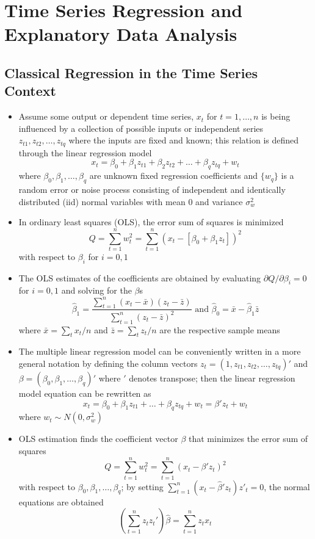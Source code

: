\documentclass[12pt]{article}
\begin{document}
\section{Time Series Regression and Explanatory Data Analysis}
\subsection{Classical Regression in the Time Series Context}
\begin{itemize}
\item Assume some output or dependent time series, $x_t$ for $t = 1,\dots,n$ is being influenced by a collection of possible inputs or independent series $z_{t1},z_{t2},\dots,z_{tq}$ where the inputs are fixed and known; this relation is defined through the linear regression model $$ x_t = \beta_0 + \beta_1z_{t1} + \beta_2z_{t2} + \dots + \beta_qz_{tq} + w_t $$ where $\beta_0,\beta_1,\dots,\beta_q$ are unknown fixed regression coefficients and $\{w_q\}$ is a random error or noise process consisting of independent and identically distributed (iid) normal variables with mean $0$ and variance $\sigma^2_w$ 
\item In ordinary least squares (OLS), the error sum of squares is minimized $$ Q = \sum_{t=1}^n w_t^2 = \sum_{t=1}^n (x_t - [\beta_0 + \beta_1z_t])^2 $$ with respect to $\beta_i$ for $i=0,1$
\item The OLS estimates of the coefficients are obtained by evaluating $\partial Q / \partial \beta_i = 0$ for $i=0,1$ and solving for the $\beta$s $$ \hat{\beta}_1 = \frac{\sum_{t=1}^n (x_t - \bar{x})(z_t - \bar{z})}{\sum_{t=1}^n (z_t - \bar{z})^2} \text{ and } \hat{\beta}_0 = \bar{x} - \hat{\beta}_1\bar{z} $$ where $\bar{x} = \sum_t x_t / n$ and $\bar{z} = \sum_t z_t / n$ are the respective sample means 
\item The multiple linear regression model can be conveniently written in a more general notation by defining the column vectors $z_t = (1, z_{t1}, z_{t2},\dots,z_{tq})'$ and $\beta = (\beta_0,\beta_1,\dots,\beta_q)'$ where $'$ denotes transpose; then the linear regression model equation can be rewritten as $$ x_t = \beta_0 + \beta_1z_{t1} + \dots + \beta_qz_{tq} + w_t = \beta'z_t + w_t $$ where $w_t \sim N(0,\sigma^2_w)$
\item OLS estimation finds the coefficient vector $\beta$ that minimizes the error sum of squares $$  Q = \sum_{t=1}^n w_t^2 = \sum_{t=1}^n (x_t - \beta'z_t)^2 $$ with respect to $\beta_0,\beta_1,\dots,\beta_q$; by setting $\sum_{t=1}^n (x_t - \hat{\beta}'z_t)z'_t = 0$, the normal equations are obtained $$ \left( \sum_{t=1}^n z_tz_t'\right)\hat{\beta} = \sum_{t=1}^n z_tx_t$$ 

\end{itemize}
\end{document}
